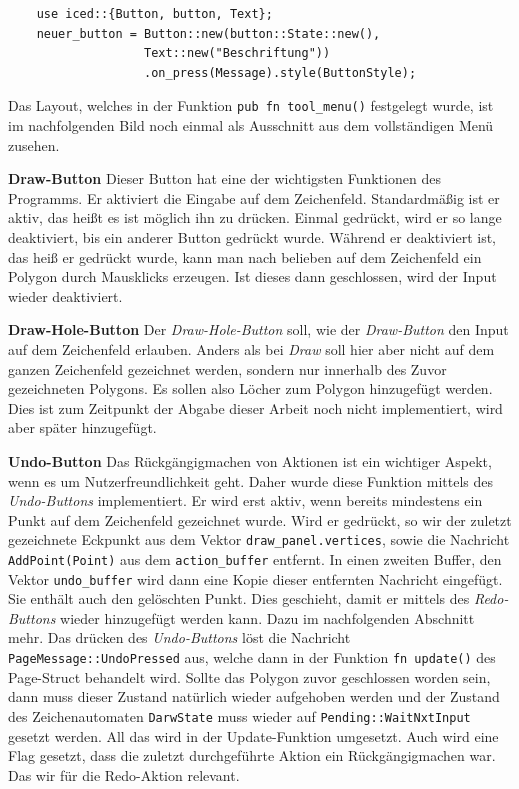 \begin{lstlisting}
    use iced::{Button, button, Text};
    neuer_button = Button::new(button::State::new(), 
                   Text::new("Beschriftung"))
                   .on_press(Message).style(ButtonStyle);
\end{lstlisting}

Das Layout, welches in der Funktion \lstinline{pub fn tool_menu()} festgelegt wurde, ist im nachfolgenden Bild noch einmal als Ausschnitt aus dem vollständigen Menü zusehen.
\linebreak

\textbf{\small{Draw-Button}}\linebreak
Dieser Button hat eine der wichtigsten Funktionen des Programms. Er aktiviert die Eingabe auf dem Zeichenfeld. Standardmäßig ist er aktiv, das heißt es ist möglich ihn zu drücken. Einmal gedrückt, wird er so lange 
deaktiviert, bis ein anderer Button gedrückt wurde. Während er deaktiviert ist, das heiß er gedrückt wurde, kann man nach belieben auf dem Zeichenfeld ein Polygon durch Mausklicks erzeugen. Ist dieses dann geschlossen, wird der 
Input wieder deaktiviert.\linebreak

\textbf{\small{Draw-Hole-Button}}\linebreak
Der \emph{Draw-Hole-Button} soll, wie der \emph{Draw-Button} den Input auf dem Zeichenfeld erlauben. Anders als bei \emph{Draw} soll hier aber nicht auf dem ganzen Zeichenfeld
gezeichnet werden, sondern nur innerhalb des Zuvor gezeichneten Polygons. Es sollen also Löcher zum Polygon hinzugefügt werden. Dies ist zum Zeitpunkt der Abgabe dieser Arbeit noch nicht implementiert, wird aber später hinzugefügt.
\linebreak

\textbf{\small{Undo-Button}}\linebreak
Das Rückgängigmachen von Aktionen ist ein wichtiger Aspekt, wenn es um Nutzerfreundlichkeit geht. Daher wurde diese Funktion mittels des \emph{Undo-Buttons} implementiert.
Er wird erst aktiv, wenn bereits mindestens ein Punkt auf dem Zeichenfeld gezeichnet wurde. Wird er gedrückt, so wir der zuletzt gezeichnete Eckpunkt aus dem Vektor \lstinline{draw_panel.vertices}, sowie die Nachricht \lstinline{AddPoint(Point)}
aus dem \lstinline{action_buffer} entfernt. In einen zweiten Buffer, den Vektor \lstinline{undo_buffer} wird dann eine Kopie dieser entfernten Nachricht eingefügt. Sie enthält auch den gelöschten Punkt.
Dies geschieht, damit er mittels des \emph{Redo-Buttons} wieder hinzugefügt werden kann. Dazu im nachfolgenden Abschnitt mehr. Das drücken des \emph{Undo-Buttons} löst die Nachricht 
\lstinline{PageMessage::UndoPressed} aus, welche dann in der Funktion \lstinline{fn update()} des Page-Struct behandelt wird. Sollte das Polygon zuvor geschlossen worden sein, dann muss dieser Zustand natürlich wieder aufgehoben werden und der Zustand 
des Zeichenautomaten \lstinline{DarwState} muss wieder auf \lstinline{Pending::WaitNxtInput} gesetzt werden. All das wird in der Update-Funktion umgesetzt. Auch wird eine Flag gesetzt, dass die zuletzt durchgeführte Aktion ein Rückgängigmachen war. Das wir 
für die Redo-Aktion relevant.\linebreak

